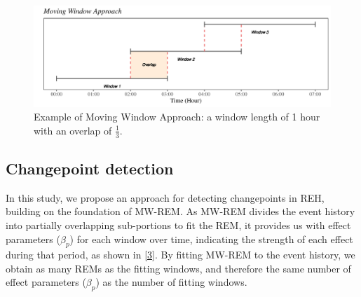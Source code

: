 \documentclass[]{interact}
\theoremstyle{plain}%
\theoremstyle{definition}
\theoremstyle{remark}
\begin{document}
{    \begin{figure}[h]
    	\captionsetup{justification=raggedright}
    	\renewcommand{\figurename}{Figure}
    	\centering
    	\includegraphics[width=13cm]{MW}
    	\caption{\fontsize{8}{10}\selectfont Example of Moving Window Approach: a window length of 1 hour with an overlap of $\frac{1}{3}$.}
    	\label{Figure 2}
    \end{figure}
    
	
	\subsection{Changepoint detection}
	
	\hspace{0.2cm} In this study, we propose an approach for detecting changepoints in REH, building on the foundation of MW-REM. As MW-REM divides the event history into partially overlapping sub-portions to fit the REM, it provides us with effect parameters ($\beta_p$) for each window over time, indicating the strength of each effect during that period, as shown in \autoref{3}. By fitting MW-REM to the event history, we obtain as many REMs as the fitting windows, and therefore the same number of effect parameters ($\beta_p$) as the number of fitting windows. \\
	
}
\end{document}
